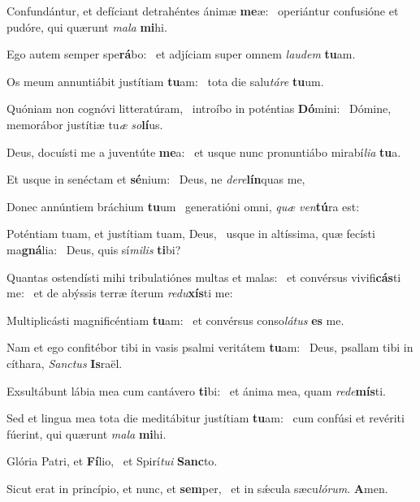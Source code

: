 \item Confundántur, et defíciant detrahéntes ánimæ \textbf{me}æ:~\psstar{} operiántur confusióne et pudóre, qui quærunt \textit{mala} \textbf{mi}hi.

\item Ego autem semper spe\textbf{rá}bo:~\psstar{} et adjíciam super omnem \textit{laudem} \textbf{tu}am.

\item Os meum annuntiábit justítiam \textbf{tu}am:~\psstar{} tota die salu\textit{táre} \textbf{tu}um.

\item Quóniam non cognóvi litteratúram,~\pscross{} introíbo in poténtias \textbf{Dó}mini:~\psstar{} Dómine, memorábor justítiæ tu\textit{æ} \textit{so}\textbf{lí}us.

\item Deus, docuísti me a juventúte \textbf{me}a:~\psstar{} et usque nunc pronuntiábo mirabí\textit{lia} \textbf{tu}a.

\item Et usque in senéctam et \textbf{sé}nium:~\psstar{} Deus, ne \textit{dere}\textbf{lín}quas me,

\item Donec annúntiem bráchium \textbf{tu}um~\psstar{} generatióni omni, \textit{quæ} \textit{ven}\textbf{tú}ra est:

\item Poténtiam tuam, et justítiam tuam, Deus,~\pscross{} usque in altíssima, quæ fecísti ma\textbf{gná}lia:~\psstar{} Deus, quis sí\textit{milis} \textbf{ti}bi?

\item Quantas ostendísti mihi tribulatiónes multas et malas:~\pscross{} et convérsus vivifi\textbf{cás}ti me:~\psstar{} et de abýssis terræ íterum \textit{redu}\textbf{xís}ti me:

\item Multiplicásti magnificéntiam \textbf{tu}am:~\psstar{} et convérsus conso\textit{látus} \textbf{es} me.

\item Nam et ego confitébor tibi in vasis psalmi veritátem \textbf{tu}am:~\psstar{} Deus, psallam tibi in cíthara, \textit{Sanctus} \textbf{Is}raël.

\item Exsultábunt lábia mea cum cantávero \textbf{ti}bi:~\psstar{} et ánima mea, quam \textit{rede}\textbf{mís}ti.

\item Sed et lingua mea tota die meditábitur justítiam \textbf{tu}am:~\psstar{} cum confúsi et revériti fúerint, qui quærunt \textit{mala} \textbf{mi}hi.

\item Glória Patri, et \textbf{Fí}lio,~\psstar{} et Spirí\textit{tui} \textbf{Sanc}to.

\item Sicut erat in princípio, et nunc, et \textbf{sem}per,~\psstar{} et in sǽcula sæcu\textit{lórum}. \textbf{A}men.
